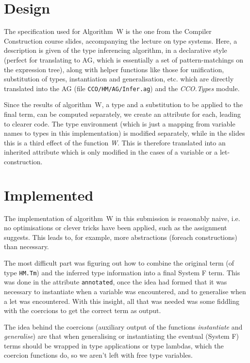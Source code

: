 \documentclass[a4paper]{article}
\begin{document}
\section{Design}

The specification used for Algorithm~W is the one from the Compiler Construction
course slides, accompanying the lecture on type systems. Here, a description is
given of the type inferencing algorithm, in a declarative style (perfect for
translating to AG, which is essentially a set of pattern-matchings on the
expression tree), along with helper functions like those for unification,
substitution of types, instantiation and generalisation, etc. which are directly translated into the AG (file
\texttt{CCO/HM/AG/Infer.ag}) and the \emph{CCO.Types} module.

Since the results of algorithm~W, a type and a substitution to be applied to the
final term, can be computed separately, we create an attribute for each, leading
to clearer code. The type environment (which is just a mapping from variable
names to types in this implementation) is modified separately, while in the
slides this is a third effect of the function \emph{W}. This is therefore
translated into an inherited attribute which is only modified in the cases of a
variable or a let-construction. 


\section{Implemented}

The implementation of algorithm~W in this submission is reasonably naive, i.e.
no optimisations or clever tricks have been applied, such as the assignment
suggests. This leads to, for example, more abstractions (foreach constructions)
than necessary. 

The most difficult part was figuring out how to combine the original term (of
type \texttt{HM.Tm}) and the inferred type information into a final System F
term. This was done in the attribute \texttt{annotated}, once the idea had
formed that it was necessary to instantiate when a variable was encountered, and
to generalise when a let was encountered. With this insight, all that was needed
was some fiddling with the coercions to get the correct term as output. 

The idea behind the coercions (auxiliary output of the functions
\emph{instantiate} and \emph{generalise}) are that when generalising or
instantiating the eventual (System F) terms should be wrapped in type
applications or type lambdas, which the coercion functions do, so we aren't left
with free type variables. 
\end{document}
